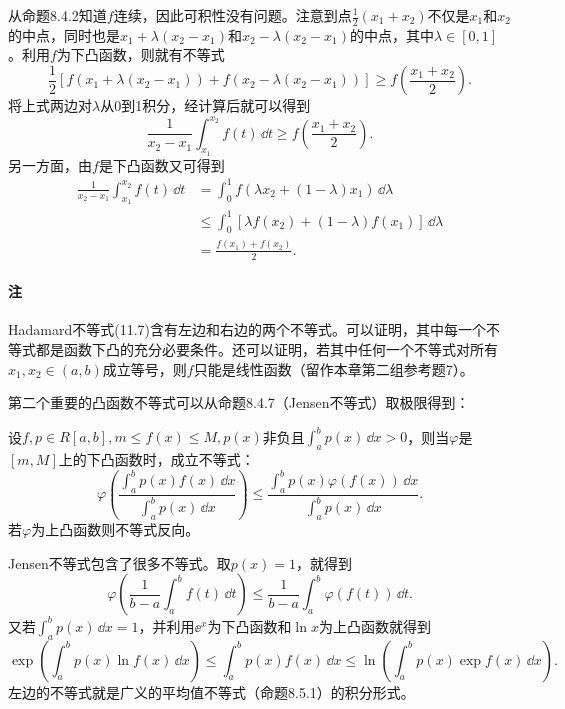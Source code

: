 \begin{xproof}
从命题8.4.2知道$f$连续，因此可积性没有问题。注意到点$\frac12(x_1+x_2)$不仅是$x_1$和$x_2$的中点，同时也是$x_1+\lambda(x_2-x_1)$和$x_2-\lambda(x_2-x_1)$的中点，其中$\lambda\in[0,1]$。利用$f$为下凸函数，则就有不等式
\begin{equation}
  \frac12[f(x_1+\lambda(x_2-x_1))+f(x_2-\lambda(x_2-x_1))]
  \ge f\left(\frac{x_1+x_2}{2}\right).
  \tag{11.8}
  \label{eq:11.8}
\end{equation}
将上式两边对$\lambda$从0到1积分，经计算后就可以得到
\begin{equation}
  \frac1{x_2-x_1}\int_{x_1}^{x_2}f(t)\,\dd t
  \ge f\left(\frac{x_1+x_2}{2}\right).
  \tag{11.9}
  \label{eq:11.9}
\end{equation}
另一方面，由$f$是下凸函数又可得到
\begin{align*}
\frac1{x_2-x_1}\int_{x_1}^{x_2}f(t)\,\dd t
&=\int_0^1f(\lambda x_2+(1-\lambda)x_1)\,\dd\lambda\\
&\le\int_0^1[\lambda f(x_2)+(1-\lambda)f(x_1)]\,\dd\lambda\\
&=\frac{f(x_1)+f(x_2)}2.
\end{align*}
\end{xproof}

\paragraph{注} Hadamard不等式(11.7)含有左边和右边的两个不等式。可以证明，其中每一个不等式都是函数下凸的充分必要条件。还可以证明，若其中任何一个不等式对所有$x_1,x_2\in(a,b)$成立等号，则$f$只能是线性函数（留作本章第二组参考题7）。

第二个重要的凸函数不等式可以从命题8.4.7（Jensen不等式）取极限得到：

\begin{xproposition}[11.2.1（Jensen不等式）]
设$f,p\in R[a,b],m\le f(x)\le M,p(x)$非负且$\int_a^bp(x)\,\dd x>0$，则当$\varphi$是$[m,M]$上的下凸函数时，成立不等式：
\[
  \varphi\left(\frac{\int_a^bp(x)f(x)\,\dd x}{\int_a^bp(x)\,\dd x}\right)
  \le\frac{\int_a^bp(x)\varphi(f(x))\,\dd x}{\int_a^bp(x)\,\dd x}.
\]
若$\varphi$为上凸函数则不等式反向。
\end{xproposition}

Jensen不等式包含了很多不等式。取$p(x)=1$，就得到
\[
  \varphi\left(\frac1{b-a}\int_a^bf(t)\,\dd t\right)
  \le\frac1{b-a}\int_a^b\varphi(f(t))\,\dd t.
\]
又若$\int_a^bp(x)\,\dd x=1$，并利用$\ee^x$为下凸函数和$\ln x$为上凸函数就得到
\begin{equation}
  \exp\left(\int_a^bp(x)\ln f(x)\,\dd x\right)
  \le\int_a^bp(x)f(x)\,\dd x
  \le\ln\left(\int_a^bp(x)\exp f(x)\,\dd x\right).
  \tag{11.10}
  \label{eq:11.10}
\end{equation}
左边的不等式就是广义的平均值不等式（命题8.5.1）的积分形式。

